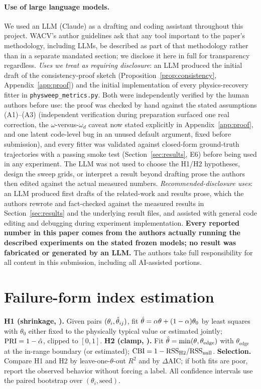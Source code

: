 \paragraph{Use of large language models.}
We used an LLM (Claude) as a drafting and coding assistant throughout this
project. WACV's author guidelines ask that any tool important to the
paper's methodology, including LLMs, be described as part of that
methodology rather than in a separate mandated section; we disclose it here
in full for transparency regardless. \emph{Uses we treat as
requiring disclosure}: an LLM produced the initial draft of the consistency-proof sketch
(Proposition~\ref{prop:consistency}, Appendix~\ref{app:proof}) and the
initial implementation of every physics-recovery fitter in
\texttt{physweep\_metrics.py}. Both were independently verified by the
human authors before use: the proof was checked by hand against the stated
assumptions (A1)--(A3) (independent verification during preparation
surfaced one real correction, the $\omega$-versus-$\omega_d$ caveat now
stated explicitly in Appendix~\ref{app:proof}, and one latent code-level
bug in an unused default argument, fixed before submission), and every
fitter was validated against closed-form ground-truth trajectories with a
passing smoke test (Section~\ref{sec:results}, E6) before being used in any
experiment. The LLM was not used to choose the H1/H2 hypotheses, design the
sweep grids, or interpret a result beyond drafting prose the authors then
edited against the actual measured numbers. \emph{Recommended-disclosure
uses}: an LLM produced first drafts of the related-work and results prose,
which the authors rewrote and fact-checked against the measured results in
Section~\ref{sec:results} and the underlying result files, and assisted
with general code editing and debugging during experiment implementation.
\textbf{Every reported number in this paper comes from the authors actually
running the described experiments on the stated frozen models; no result
was fabricated or generated by an LLM.} The authors take full
responsibility for all content in this submission, including all
AI-assisted portions.




\appendix
\section{Failure-form index estimation}
\label{app:pri}
\textbf{H1 (shrinkage, \PRI).} Given pairs $(\theta_i,\hat{\theta}_{ij})$, fit
$\hat{\theta}=\alpha\theta+(1-\alpha)\theta_0$ by least squares with $\theta_0$
either fixed to the physically typical value or estimated jointly; $\mathrm{PRI}=1-\hat\alpha$,
clipped to $[0,1]$. \textbf{H2 (clamp, \CBI).} Fit
$\hat{\theta}=\min(\theta,\theta_{\text{edge}})$ with $\theta_{\text{edge}}$ at the
in-range boundary (or estimated); $\mathrm{CBI}=1-\mathrm{RSS}_{\text{H2}}/\mathrm{RSS}_{\text{null}}$.
\textbf{Selection.} Compare H1 and H2 by leave-one-$\theta$-out $R^2$ and by
$\Delta$AIC; if both fits are poor, report the observed behavior without forcing
a label. All confidence intervals use the paired bootstrap over
$(\theta_i,\text{seed})$.

